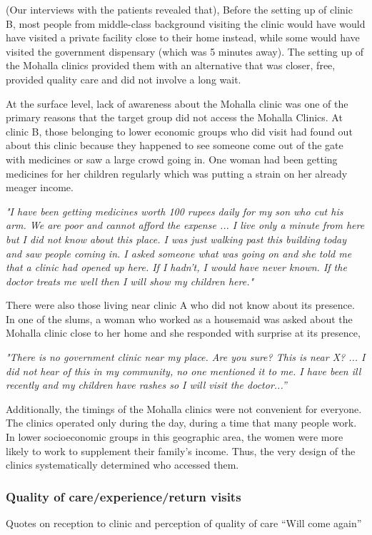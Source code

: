 (Our interviews with the patients revealed that), Before the setting up of clinic B, most people from middle-class background visiting the clinic would have would have visited a private facility close to their home instead, while some would have visited the government dispensary (which was 5 minutes away). The setting up of the Mohalla clinics provided them with an alternative that was closer, free, provided quality care and did not involve a long wait. 

At the surface level, lack of awareness about the Mohalla clinic was one of the primary reasons that the target group did not access the Mohalla Clinics. At clinic B, those belonging to lower economic groups who did visit had found out about this clinic because they happened to see someone come out of the gate with medicines or saw a large crowd going in. One woman had been getting medicines for her children regularly which was putting a strain on her already meager income. 

\textit{"I have been getting medicines worth 100 rupees daily for my son who cut his arm. We are poor and cannot afford the expense ... I live only a minute from here but I did not know about this place. I was just walking past this building today and saw people coming in. I asked someone what was going on and she told me that a clinic had opened up here. If I hadn't, I would have never known. If the doctor treats me well then I will show my children here."}

There were also those living near clinic A who did not know about its presence. In one of the slums, a woman who worked as a housemaid was asked about the Mohalla clinic close to her home and she responded with surprise at its presence,

\textit{"There is no government clinic near my place. Are you sure? This is near X? ... I did not hear of this in my community, no one mentioned it to me. I have been ill recently and my children have rashes so I will visit the doctor...”}

Additionally, the timings of the Mohalla clinics were not convenient for everyone. The clinics operated only during the day, during a time that many people work. In lower socioeconomic groups in this geographic area, the women were more likely to work to supplement their family's income. Thus, the very design of the clinics systematically determined who accessed them.

\subsubsection{Quality of care/experience/return visits}
Quotes on reception to clinic and perception of quality of care
“Will come again”

